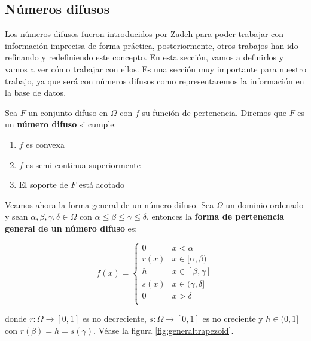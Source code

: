 \subsection{Números difusos}\label{fuzzynumbers}

Los números difusos fueron introducidos por Zadeh \cite{fuzzynumberszadeh} para poder trabajar con información imprecisa de forma práctica, posteriormente, otros trabajos han ido refinando y redefiniendo este concepto. En esta sección, vamos a definirlos y vamos a ver cómo trabajar con ellos. Es una sección muy importante para nuestro trabajo, ya que será con números difusos como representaremos la información en la base de datos. 

\begin{definition}
Sea $F$ un conjunto difuso en $\Omega$ con $f$ su función de pertenencia. Diremos que $F$ es un \textbf{número difuso} si cumple:

\begin{enumerate}
    \item $f$ es convexa
    \item $f$ es semi-continua superiormente
    \item El soporte de $F$ está acotado 
\end{enumerate}
\end{definition}

Veamos ahora la forma general de un número difuso. Sea $\Omega$ un dominio ordenado y sean $\alpha, \beta, \gamma, \delta \in \Omega$ con $\alpha \leq \beta \leq \gamma \leq \delta$, entonces la \textbf{forma de pertenencia general de un número difuso} es:

\begin{equation*}
    f(x) = \left\{ { \begin{array}{cc}
                    0 & x < \alpha \\ 
                    r(x) & x\in [\alpha,\beta) \\
                    h & x\in [\beta,\gamma] \\
                    s(x) & x\in (\gamma,\delta] \\
                    0 & x > \delta \\ 
                    \end{array}  } \right.
\end{equation*}

donde $r: \Omega \longrightarrow [0,1]$ es no decreciente, $s: \Omega \longrightarrow [0,1]$ es no creciente y $h \in (0,1]$ con $r(\beta) = h = s(\gamma)$. Véase la figura \ref{fig:generaltrapezoid}.

